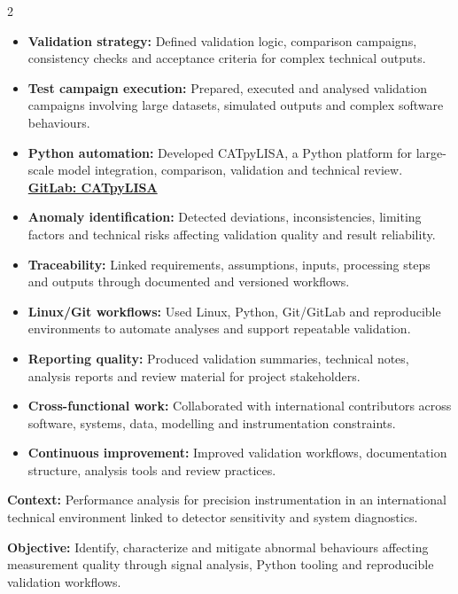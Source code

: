 \documentclass[8pt,a4paper,ragged2e,withhyper]{altacv}
\begin{document}
\begin{paracol}{2}
\begin{itemize}
  \item \textbf{Validation strategy:} Defined validation logic, comparison campaigns, consistency checks and acceptance criteria for complex technical outputs.
  \item \textbf{Test campaign execution:} Prepared, executed and analysed validation campaigns involving large datasets, simulated outputs and complex software behaviours.
  \item \textbf{Python automation:} Developed CATpyLISA, a Python platform for large-scale model integration, comparison, validation and technical review.
  \textcolor{DarkPastelRed}{\href{https://gitlab.oca.eu/gboileau/lisa_l3_tools}{\bf GitLab: CATpyLISA}}
  \item \textbf{Anomaly identification:} Detected deviations, inconsistencies, limiting factors and technical risks affecting validation quality and result reliability.
  \item \textbf{Traceability:} Linked requirements, assumptions, inputs, processing steps and outputs through documented and versioned workflows.
  \item \textbf{Linux/Git workflows:} Used Linux, Python, Git/GitLab and reproducible environments to automate analyses and support repeatable validation.
  \item \textbf{Reporting quality:} Produced validation summaries, technical notes, analysis reports and review material for project stakeholders.
  \item \textbf{Cross-functional work:} Collaborated with international contributors across software, systems, data, modelling and instrumentation constraints.
  \item \textbf{Continuous improvement:} Improved validation workflows, documentation structure, analysis tools and review practices.
\end{itemize}

\divider


\textbf{Context:} Performance analysis for precision instrumentation in an international technical environment linked to detector sensitivity and system diagnostics.

\textbf{Objective:} Identify, characterize and mitigate abnormal behaviours affecting measurement quality through signal analysis, Python tooling and reproducible validation workflows.


\end{paracol}
\end{document}
